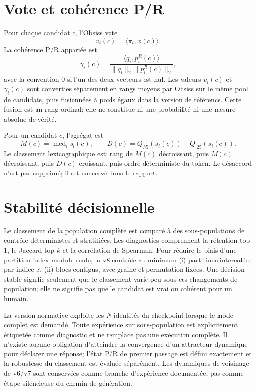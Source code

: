 \documentclass[11pt,a4paper]{report}
\newcommand{\med}{\operatorname{med}}
\begin{document}
\section{Vote et cohérence P/R}
Pour chaque candidat $c$, l'Obsiss vote
\[
 v_i(c)=\langle\pi_i,\phi(c)\rangle.
\]
La cohérence P/R appariée est
\[
 \gamma_i(c)=\frac{\langle q_i,p_i^R(c)\rangle}
 {\|q_i\|_2\|p_i^R(c)\|_2},
\]
avec la convention $0$ si l'un des deux vecteurs est nul. Les valeurs $v_i(c)$ et $\gamma_i(c)$ sont converties séparément en rangs moyens par Obsiss sur le même pool de candidats, puis fusionnées à poids égaux dans la version de référence. Cette fusion est un rang ordinal; elle ne constitue ni une probabilité ni une mesure absolue de vérité.

Pour un candidat $c$, l'agrégat est
\[
 M(c)=\med_i s_i(c),\qquad D(c)=Q_{.75}(s_i(c))-Q_{.25}(s_i(c)).
\]
Le classement lexicographique est: rang de $M(c)$ décroissant, puis $M(c)$ décroissant, puis $D(c)$ croissant, puis ordre déterministe du token. Le désaccord n'est pas supprimé; il est conservé dans le rapport.

\section{Stabilité décisionnelle}
Le classement de la population complète est comparé à des sous-populations de contrôle déterministes et stratifiées. Les diagnostics comprennent la rétention top-1, le Jaccard top-$k$ et la corrélation de Spearman. Pour réduire le biais d'une partition index-modulo seule, la v8 contrôle au minimum (i) partitions intercalées par indice et (ii) blocs contigus, avec graine et permutation fixées. Une décision stable signifie seulement que le classement varie peu sous ces changements de population; elle ne signifie pas que le candidat est vrai ou cohérent pour un humain.

La version normative exploite les $N$ identités du checkpoint lorsque le mode complet est demandé. Toute expérience sur sous-population est explicitement étiquetée comme diagnostic et ne remplace pas une exécution complète. Il n'existe aucune obligation d'atteindre la convergence d'un attracteur dynamique pour déclarer une réponse; l'état P/R de premier passage est défini exactement et la robustesse du classement est évaluée séparément. Les dynamiques de voisinage de v6/v7 sont conservées comme branche d'expérience documentée, pas comme étape silencieuse du chemin de génération.
\end{document}
